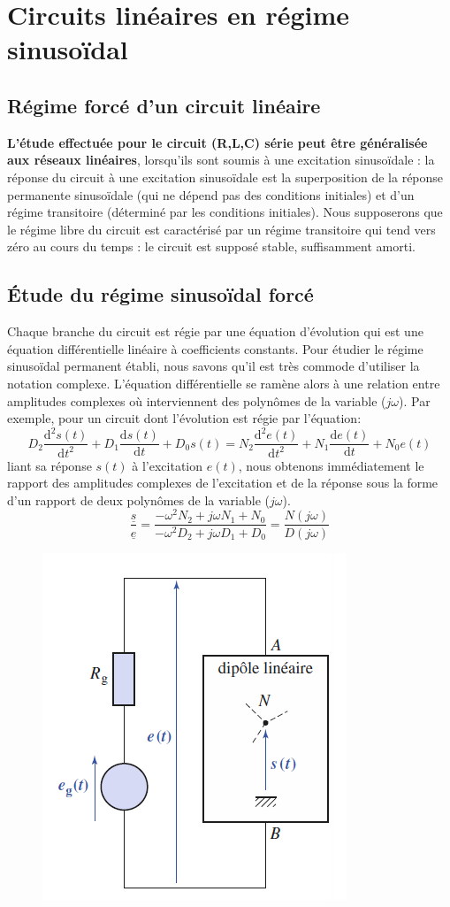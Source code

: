 \documentclass[12pt]{book}
\theoremstyle{definition}\newtheorem{dfn}{Définition}[chapter]
\theoremstyle{plain}\newtheorem{thm}{Théorème}[chapter]
\theoremstyle{plain}\newtheorem{prp}{Proposition}[chapter]
\theoremstyle{plain}\newtheorem{lem}{\bf Lemme}[chapter]
\theoremstyle{plain}\newtheorem{axm}{\bf Axiome}[chapter]
\theoremstyle{plain}\newtheorem{lmm}{\bf Lemme}[chapter]
\theoremstyle{plain}\newtheorem{cor}{\bf Corollaire}[chapter]
\theoremstyle{remark}\newtheorem{rem}{Remarque}[chapter]
\begin{document}
\section{Circuits linéaires en régime sinusoïdal}
\subsection{Régime forcé d’un circuit linéaire}
\textbf{L'étude effectuée pour le circuit (R,L,C) série peut être généralisée aux
	réseaux linéaires}, lorsqu'ils sont soumis à une excitation sinusoïdale : la
réponse du circuit à une excitation sinusoïdale est la superposition de la
réponse permanente sinusoïdale (qui ne dépend pas des conditions initiales) et
d'un régime transitoire (déterminé par les conditions initiales).
Nous supposerons que le régime libre du circuit est caractérisé par un régime
transitoire qui tend vers zéro au cours du temps : le circuit est supposé stable,
suffisamment amorti.
\subsection{Étude du régime sinusoïdal forcé}
Chaque branche du circuit est régie par une équation d'évolution qui est une
équation différentielle linéaire à coefficients constants. Pour étudier le régime
sinusoïdal permanent établi, nous savons qu'il est très commode d'utiliser la
notation complexe. L'équation différentielle se ramène alors à une relation
entre amplitudes complexes où interviennent des polynômes de la variable ($j\omega$).
Par exemple, pour un circuit dont l'évolution est régie par l'équation:
$$
D_2\frac{\mathrm{d^2}s(t)}{\mathrm{d}t^2}+D_1\frac{\mathrm{d}s(t)}{\mathrm{d}t}+D_0s(t)=N_2\frac{\mathrm{d^2}e(t)}{\mathrm{d}t^2}+N_1\frac{\mathrm{d}e(t)}{\mathrm{d}t}+N_0e(t)
$$
liant sa réponse $s(t)$ à l'excitation $e(t)$, nous obtenons immédiatement le rapport
des amplitudes complexes de l'excitation et de la réponse sous la forme
d'un rapport de deux polynômes de la variable ($j\omega$).
$$
\frac{\underline{s}}{\underline{e}}=\frac{-\omega^2N_2+j\omega N_1+N_0}{-\omega^2D_2+j\omega D_1+D_0}=\frac{N(j\omega)}{D(j\omega)}
$$

\begin{figure}[H]
	\centering
	\includegraphics[scale=1]{Etude du circuit RLC serie-Resonances//10}
\end{figure}
\end{document}
